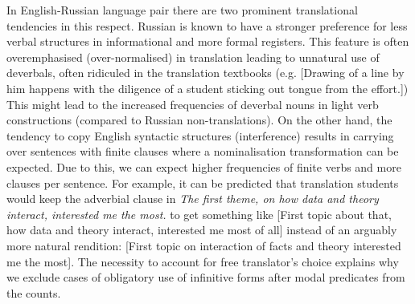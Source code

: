 In English-Russian language pair there are two prominent translational tendencies in this respect. Russian is known to have a stronger preference for less verbal structures in informational and more formal registers. This feature is often overemphasised (over-normalised) in translation leading to unnatural use of deverbals, often ridiculed in the translation textbooks (e.g.  [Drawing of a line by him happens with the diligence of a student sticking out tongue from the effort.]) This might lead to the increased frequencies of deverbal nouns in light verb constructions (compared to Russian non-translations). On the other hand, the tendency to copy English syntactic structures (interference) results in carrying over sentences with finite clauses where a nominalisation transformation can be expected. Due to this, we can expect higher frequencies of finite verbs and more clauses per sentence. For example, it can be predicted that translation students would keep the adverbial clause in \textit{The first theme, on how data and theory interact, interested me the most.} to get something like  [First topic about that, how data and theory interact, interested me most of all] instead of an arguably more natural rendition:  [First topic on interaction of facts and theory interested me the most].   
The necessity to account for free translator's choice explains why we exclude cases of obligatory use of infinitive forms after modal predicates from the counts.

